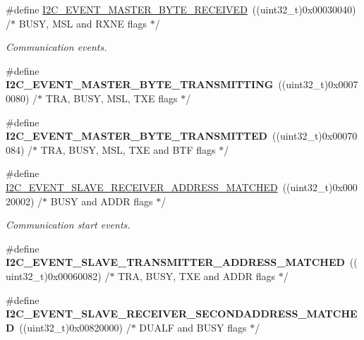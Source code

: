 \begin{DoxyCompactItemize}
\item 
\#define \hyperlink{group___i2_c___events_ga6bcf2ae49961e07e27cf9fdf334719e3}{I2\-C\-\_\-\-E\-V\-E\-N\-T\-\_\-\-M\-A\-S\-T\-E\-R\-\_\-\-B\-Y\-T\-E\-\_\-\-R\-E\-C\-E\-I\-V\-E\-D}~((uint32\-\_\-t)0x00030040)  /$\ast$ B\-U\-S\-Y, M\-S\-L and R\-X\-N\-E flags $\ast$/
\begin{DoxyCompactList}\small\item\em Communication events. \end{DoxyCompactList}\item 
\hypertarget{group___i2_c___events_ga037ac1e67e44ee085acac6f034bd73b2}{\#define {\bfseries I2\-C\-\_\-\-E\-V\-E\-N\-T\-\_\-\-M\-A\-S\-T\-E\-R\-\_\-\-B\-Y\-T\-E\-\_\-\-T\-R\-A\-N\-S\-M\-I\-T\-T\-I\-N\-G}~((uint32\-\_\-t)0x00070080) /$\ast$ T\-R\-A, B\-U\-S\-Y, M\-S\-L, T\-X\-E flags $\ast$/}\label{group___i2_c___events_ga037ac1e67e44ee085acac6f034bd73b2}

\item 
\hypertarget{group___i2_c___events_ga8fe3b96b54e3c38e1de5d48536039c8f}{\#define {\bfseries I2\-C\-\_\-\-E\-V\-E\-N\-T\-\_\-\-M\-A\-S\-T\-E\-R\-\_\-\-B\-Y\-T\-E\-\_\-\-T\-R\-A\-N\-S\-M\-I\-T\-T\-E\-D}~((uint32\-\_\-t)0x00070084)  /$\ast$ T\-R\-A, B\-U\-S\-Y, M\-S\-L, T\-X\-E and B\-T\-F flags $\ast$/}\label{group___i2_c___events_ga8fe3b96b54e3c38e1de5d48536039c8f}

\item 
\#define \hyperlink{group___i2_c___events_ga6cf0e334704618b024eee604849f50f7}{I2\-C\-\_\-\-E\-V\-E\-N\-T\-\_\-\-S\-L\-A\-V\-E\-\_\-\-R\-E\-C\-E\-I\-V\-E\-R\-\_\-\-A\-D\-D\-R\-E\-S\-S\-\_\-\-M\-A\-T\-C\-H\-E\-D}~((uint32\-\_\-t)0x00020002) /$\ast$ B\-U\-S\-Y and A\-D\-D\-R flags $\ast$/
\begin{DoxyCompactList}\small\item\em Communication start events. \end{DoxyCompactList}\item 
\hypertarget{group___i2_c___events_ga3fa381c1fd9a95c8ae13c6cc402b1327}{\#define {\bfseries I2\-C\-\_\-\-E\-V\-E\-N\-T\-\_\-\-S\-L\-A\-V\-E\-\_\-\-T\-R\-A\-N\-S\-M\-I\-T\-T\-E\-R\-\_\-\-A\-D\-D\-R\-E\-S\-S\-\_\-\-M\-A\-T\-C\-H\-E\-D}~((uint32\-\_\-t)0x00060082) /$\ast$ T\-R\-A, B\-U\-S\-Y, T\-X\-E and A\-D\-D\-R flags $\ast$/}\label{group___i2_c___events_ga3fa381c1fd9a95c8ae13c6cc402b1327}

\item 
\hypertarget{group___i2_c___events_ga17e78ab01fa980b3df10f8d9f6864c48}{\#define {\bfseries I2\-C\-\_\-\-E\-V\-E\-N\-T\-\_\-\-S\-L\-A\-V\-E\-\_\-\-R\-E\-C\-E\-I\-V\-E\-R\-\_\-\-S\-E\-C\-O\-N\-D\-A\-D\-D\-R\-E\-S\-S\-\_\-\-M\-A\-T\-C\-H\-E\-D}~((uint32\-\_\-t)0x00820000)  /$\ast$ D\-U\-A\-L\-F and B\-U\-S\-Y flags $\ast$/}\label{group___i2_c___events_ga17e78ab01fa980b3df10f8d9f6864c48}


\end{DoxyCompactItemize}

